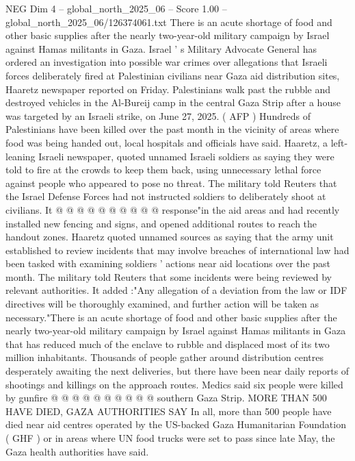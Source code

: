 \begin{textsample}{NEG Dim 4 – global\_north\_2025\_06 – Score 1.00 – global\_north\_2025\_06/126374061.txt}  \label{ex:f4_neg_080}
There is an acute shortage of food and other basic supplies after the nearly two-year-old military campaign by Israel against Hamas militants in Gaza.
Israel ' s Military Advocate General has ordered an investigation into possible war crimes over allegations that Israeli forces deliberately fired at Palestinian civilians near Gaza aid distribution sites, Haaretz newspaper reported on Friday.
Palestinians walk past the rubble and destroyed vehicles in the Al-Bureij camp in the central Gaza Strip after a house was targeted by an Israeli strike, on June 27, 2025. ( AFP ) Hundreds of Palestinians have been killed over the past month in the vicinity of areas where food was being handed out, local hospitals and officials have said.
Haaretz, a left-leaning Israeli newspaper, quoted unnamed Israeli soldiers as saying they were told to fire at the crowds to keep them back, using unnecessary lethal force against people who appeared to pose no threat.
The military told Reuters that the Israel Defense Forces had not instructed soldiers to deliberately shoot at civilians.
It @ @ @ @ @ @ @ @ @ @ response"in the aid areas and had recently installed new fencing and signs, and opened additional routes to reach the handout zones.
Haaretz quoted unnamed sources as saying that the army unit established to review incidents that may involve breaches of international law had been tasked with examining soldiers ' actions near aid locations over the past month.
The military told Reuters that some incidents were being reviewed by relevant authorities.
It added :"Any allegation of a deviation from the law or IDF directives will be thoroughly examined, and further action will be taken as necessary."There is an acute shortage of food and other basic supplies after the nearly two-year-old military campaign by Israel against Hamas militants in Gaza that has reduced much of the enclave to rubble and displaced most of its two million inhabitants.
Thousands of people gather around distribution centres desperately awaiting the next deliveries, but there have been near daily reports of shootings and killings on the approach routes.
Medics said six people were killed by gunfire @ @ @ @ @ @ @ @ @ @ southern Gaza Strip.
MORE THAN 500 HAVE DIED, GAZA AUTHORITIES SAY In all, more than 500 people have died near aid centres operated by the US-backed Gaza Humanitarian Foundation ( GHF ) or in areas where UN food trucks were set to pass since late May, the Gaza health authorities have said.

\end{textsample}
